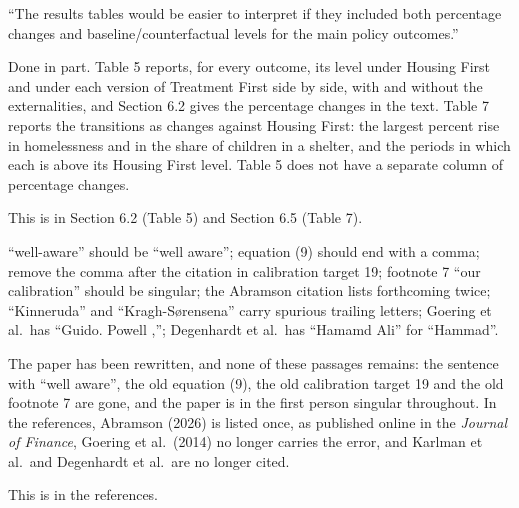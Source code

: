 \documentclass[11pt]{article}
\begin{document}
\begin{referee}
``The results tables would be easier to interpret if they included both percentage
changes and baseline/counterfactual levels for the main policy outcomes.''
\end{referee}
\begin{response}
Done in part. Table 5 reports, for every outcome, its level under Housing First
and under each version of Treatment First side by side, with and without the
externalities, and Section 6.2 gives the percentage changes in the text. Table 7
reports the transitions as changes against Housing First: the largest percent rise
in homelessness and in the share of children in a shelter, and the periods in
which each is above its Housing First level. \open Table 5 does not have a
separate column of percentage changes.

This is in Section 6.2 (Table 5) and Section 6.5 (Table 7).
\end{response}

\begin{referee}
``well-aware'' should be ``well aware''; equation (9) should end with a comma;
remove the comma after the citation in calibration target 19; footnote 7 ``our
calibration'' should be singular; the Abramson citation lists forthcoming twice;
``Kinneruda'' and ``Kragh-S\o rensena'' carry spurious trailing letters; Goering et
al.\ has ``Guido. Powell ,''; Degenhardt et al.\ has ``Hamamd Ali'' for
``Hammad''.
\end{referee}
\begin{response}
The paper has been rewritten, and none of these passages remains: the sentence
with ``well aware'', the old equation (9), the old calibration target 19 and the old
footnote 7 are gone, and the paper is in the first person singular throughout. In
the references, Abramson (2026) is listed once, as published online in the
\emph{Journal of Finance}, Goering et al.\ (2014) no longer carries the error, and
Karlman et al.\ and Degenhardt et al.\ are no longer cited.

This is in the references.
\end{response}
\end{document}
